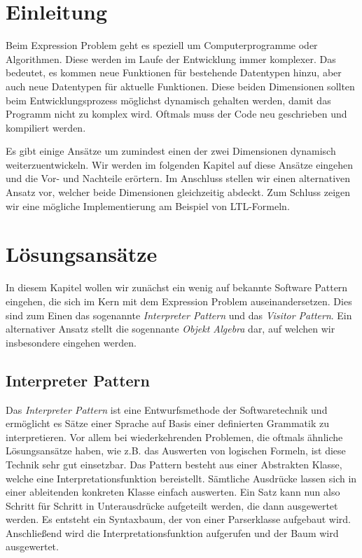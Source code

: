 \documentclass{llncs}
\begin{document}
\section{Einleitung} \label{sec:introduction}

Beim Expression Problem geht es speziell um Computerprogramme oder Algorithmen. Diese werden im Laufe der Entwicklung immer komplexer. Das bedeutet, es kommen neue Funktionen für bestehende Datentypen hinzu, aber auch neue Datentypen für aktuelle Funktionen. Diese beiden Dimensionen sollten beim Entwicklungsprozess möglichst dynamisch gehalten werden, damit das Programm nicht zu komplex wird. Oftmals muss der Code neu geschrieben und kompiliert werden. 
\cite{wadler98}

Es gibt einige Ansätze um zumindest einen der zwei Dimensionen dynamisch weiterzuentwickeln. Wir werden im folgenden Kapitel auf diese Ansätze eingehen und die Vor- und Nachteile erörtern. Im Anschluss stellen wir einen alternativen Ansatz vor, welcher beide Dimensionen gleichzeitig abdeckt. Zum Schluss zeigen wir eine mögliche Implementierung am Beispiel von LTL-Formeln.   

\section{Lösungsansätze} \label{sec:approaches}

In diesem Kapitel wollen wir zunächst ein wenig auf bekannte Software Pattern eingehen, die sich im Kern mit dem Expression Problem auseinandersetzen. Dies sind zum Einen das sogenannte \emph{Interpreter Pattern} und das \emph{Visitor Pattern}. Ein alternativer Ansatz stellt die sogennante \emph{Objekt Algebra} dar, auf welchen wir insbesondere eingehen werden. 

\subsection{Interpreter Pattern} \label{sec:interpreter}

Das \emph{Interpreter Pattern} ist eine Entwurfsmethode der Softwaretechnik und ermöglicht es Sätze einer Sprache auf Basis einer definierten Grammatik zu interpretieren. Vor allem bei wiederkehrenden Problemen, die oftmals ähnliche Lösungsansätze haben, wie z.B. das Auswerten von logischen Formeln, ist diese Technik sehr gut einsetzbar. Das Pattern besteht aus einer Abstrakten Klasse, welche eine Interpretationsfunktion bereistellt. Sämtliche Ausdrücke lassen sich in einer ableitenden konkreten Klasse einfach auswerten. Ein Satz kann nun also Schritt für Schritt in Unterausdrücke aufgeteilt werden, die dann ausgewertet werden. Es entsteht ein Syntaxbaum, der von einer Parserklasse aufgebaut wird. Anschließend wird die Interpretationsfunktion aufgerufen und der Baum wird ausgewertet. 
\end{document}
